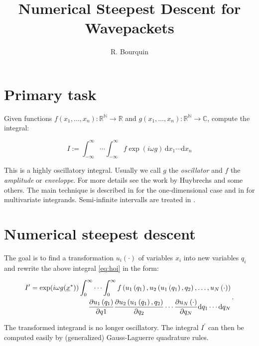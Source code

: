 \documentclass[a4paper,10pt]{article}
\title{Numerical Steepest Descent for Wavepackets}
\author{R. Bourquin}
\begin{document}
\maketitle

\section{Primary task}

Given functions $f(x_1, \ldots, x_n):\mathbb{R^N}\rightarrow\mathbb{R}$ and
$g(x_1, \ldots, x_n):\mathbb{R^N}\rightarrow\mathbb{C}$, compute the integral:

\begin{equation} \label{eq:hoi}
 I := \int_{-\infty}^{\infty} \cdots \int_{-\infty}^{\infty} f \exp(i \omega g) \, \mathrm{d}x_1 \cdots \mathrm{d}x_n
\end{equation}

This is a highly oscillatory integral. Usually we call $g$ the \emph{oscillator}
and $f$ the \emph{amplitude} or \emph{enveloppe}. For more details see the work
by Huybrechs and some others. The main technique is described in \cite{HV_hoq} for
the one-dimensional case and in \cite{HV_cub} for multivariate integrands.
Semi-infinite intervalls are treated in \cite{H_nsd_sii}.


\section{Numerical steepest descent}

The goal is to find a transformation $u_i(\cdot)$ of variables $x_i$ into new variables $q_i$
and rewrite the above integral \eqref{eq:hoi} in the form:

\begin{equation} \label{eq:noi}
 \begin{split}
 I^\prime = \exp(i \omega g(\underline{x}^{*}))
     \int_{0}^{\infty} \cdots \int_{0}^{\infty}
     f\left(u_1\left(q_1\right), u_2\left(u_1\left(q_1\right), q_2\right), \ldots, u_N\left(\cdot\right)\right) \\
     \frac{\partial u_1\left(q_1\right)}{\partial q1}
     \frac{\partial u_2\left(u_1\left(q_1\right), q_2\right)}{\partial q_2}
     \cdots
     \frac{\partial u_N\left(\cdot\right)}{\partial q_N}
     \mathrm{d}q_1 \cdots \mathrm{d}q_N
 \end{split} \,.
\end{equation}

The transformed integrand is no longer oscillatory. The integral $I^\prime$
can then be computed easily by (generalized) Gauss-Laguerre quadrature rules.
\end{document}
